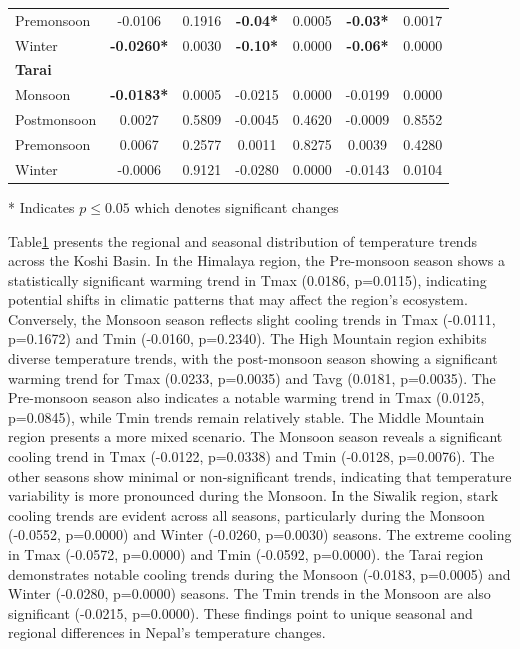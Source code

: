 \begin{table}[htbp]
\begin{tabular}{@{}lcccccc@{}}
      Premonsoon & -0.0106 & 0.1916 & \textbf{-0.04*} & 0.0005 & \textbf{-0.03*} & 0.0017 \\ 
      Winter & \textbf{-0.0260*} & 0.0030 & \textbf{-0.10*} & 0.0000 & \textbf{-0.06*} & 0.0000 \\ 
      \midrule
      \textbf{Tarai} & & & & & & \\ 
      Monsoon & \textbf{-0.0183*} & 0.0005 & -0.0215 & 0.0000 & -0.0199 & 0.0000 \\ 
      Postmonsoon & 0.0027 & 0.5809 & -0.0045 & 0.4620 & -0.0009 & 0.8552 \\ 
      Premonsoon & 0.0067 & 0.2577 & 0.0011 & 0.8275 & 0.0039 & 0.4280 \\ 
      Winter & -0.0006 & 0.9121 & -0.0280 & 0.0000 & -0.0143 & 0.0104 \\ 
      \bottomrule
  \end{tabular}
  \label{tab:spatial_trends}
  \begin{flushleft}
    \footnotesize{* Indicates \( p \leq 0.05 \) which denotes significant changes} \\
    
\end{flushleft}
\end{table}




Table\ref{tab:spatial_trends} presents the regional and seasonal distribution of temperature trends across the Koshi Basin. In the Himalaya region, the Pre-monsoon season shows a statistically significant warming trend in Tmax (0.0186, p=0.0115), indicating potential shifts in climatic patterns that may affect the region’s ecosystem. Conversely, the Monsoon season reflects slight cooling trends in Tmax (-0.0111, p=0.1672) and Tmin (-0.0160, p=0.2340). The High Mountain region exhibits diverse temperature trends, with the post-monsoon season showing a significant warming trend for Tmax (0.0233, p=0.0035) and Tavg (0.0181, p=0.0035). The Pre-monsoon season also indicates a notable warming trend in Tmax (0.0125, p=0.0845), while Tmin trends remain relatively stable. The Middle Mountain region presents a more mixed scenario. The Monsoon season reveals a significant cooling trend in Tmax (-0.0122, p=0.0338) and Tmin (-0.0128, p=0.0076). The other seasons show minimal or non-significant trends, indicating that temperature variability is more pronounced during the Monsoon. In the Siwalik region, stark cooling trends are evident across all seasons, particularly during the Monsoon (-0.0552, p=0.0000) and Winter (-0.0260, p=0.0030) seasons. The extreme cooling in Tmax (-0.0572, p=0.0000) and Tmin (-0.0592, p=0.0000). the Tarai region demonstrates notable cooling trends during the Monsoon (-0.0183, p=0.0005) and Winter (-0.0280, p=0.0000) seasons. The Tmin trends in the Monsoon are also significant (-0.0215, p=0.0000). These findings point to unique seasonal and regional differences in Nepal's temperature changes.


